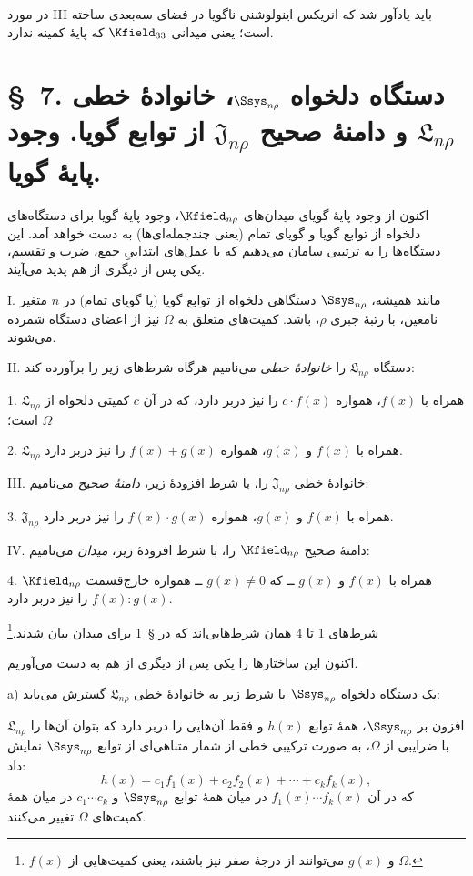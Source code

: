 \documentclass[11pt]{article}
\newcommand{\srcLTR}[1]{\relax\ifmmode\text{\mbox{\babelsublr{\foreignlanguage{english}{#1}}}}\else\babelsublr{\foreignlanguage{english}{#1}}\fi}
\newcommand{\srcfn}[2]{\begingroup\renewcommand{\thefootnote}{\srcLTR{#1}}\footnote{#2}\addtocounter{footnote}{-1}\endgroup}
\providecommand{\Lsys}{\mathfrak{L}}
\providecommand{\Jdom}{\mathfrak{J}}
\begin{document}
در مورد III باید یادآور شد که انریکس اینولوشنی ناگویا در فضای سه‌بعدی ساخته است؛ یعنی میدانی $\Kfield_{33}$ که پایهٔ کمینه ندارد.

\section*{\S\ 7. دستگاه دلخواه $\Ssys_{n\rho}$، خانوادهٔ خطی $\Lsys_{n\rho}$ و دامنهٔ صحیح $\Jdom_{n\rho}$ از توابع گویا. وجود پایهٔ گویا.}

اکنون از وجود پایهٔ گویای میدان‌های $\Kfield_{n\rho}$، وجود پایهٔ گویا برای دستگاه‌های دلخواه از توابع گویا و گویای تمام (یعنی چندجمله‌ای‌ها) به دست خواهد آمد. این دستگاه‌ها را به ترتیبی سامان می‌دهیم که با عمل‌های ابتداییِ جمع، ضرب و تقسیم، یکی پس از دیگری از هم پدید می‌آیند.

I. مانند همیشه، $\Ssys_{n\rho}$ دستگاهی دلخواه از توابع گویا (یا گویای تمام) در $n$ متغیر نامعین، با رتبهٔ جبری $\rho$، باشد. کمیت‌های متعلق به $\Omega$ نیز از اعضای دستگاه شمرده می‌شوند.

II. دستگاه $\Lsys_{n\rho}$ را \emph{خانوادهٔ خطی} می‌نامیم هرگاه شرط‌های زیر را برآورده کند:

1. $\Lsys_{n\rho}$ همراه با $f(x)$، همواره $c\cdot f(x)$ را نیز دربر دارد، که در آن $c$ کمیتی دلخواه از $\Omega$ است؛

2. $\Lsys_{n\rho}$ همراه با $f(x)$ و $g(x)$، همواره $f(x)+g(x)$ را نیز دربر دارد.

III. خانوادهٔ خطی $\Jdom_{n\rho}$ را، با شرط افزودهٔ زیر، \emph{دامنهٔ صحیح} می‌نامیم:

3. $\Jdom_{n\rho}$ همراه با $f(x)$ و $g(x)$، همواره $f(x)\cdot g(x)$ را نیز دربر دارد.

IV. دامنهٔ صحیح $\Kfield_{n\rho}$ را، با شرط افزودهٔ زیر، \emph{میدان} می‌نامیم:

4. $\Kfield_{n\rho}$ همراه با $f(x)$ و $g(x)$ ــ که $g(x)\ne0$ ــ همواره خارج‌قسمت $f(x):g(x)$ را نیز دربر دارد.

شرط‌های 1 تا 4 همان شرط‌هایی‌اند که در \S\ 1 برای میدان بیان شدند.\srcfn{*)}{$f(x)$ و $g(x)$ می‌توانند از درجهٔ صفر نیز باشند، یعنی کمیت‌هایی از $\Omega$.}

اکنون این ساختارها را یکی پس از دیگری از هم به دست می‌آوریم.

a) یک دستگاه دلخواه $\Ssys_{n\rho}$ با شرط زیر به خانوادهٔ خطی $\Lsys_{n\rho}$ گسترش می‌یابد:

$\Lsys_{n\rho}$ افزون بر $\Ssys_{n\rho}$، همهٔ توابع $h(x)$ و فقط آن‌هایی را دربر دارد که بتوان آن‌ها را با ضرایبی از $\Omega$، به صورت ترکیبی خطی از شمار متناهی‌ای از توابع $\Ssys_{n\rho}$ نمایش داد:
\[
h(x)=c_1f_1(x)+c_2f_2(x)+\cdots+c_kf_k(x),
\]
که در آن $f_1(x)\cdots f_k(x)$ در میان همهٔ توابع $\Ssys_{n\rho}$ و $c_1\cdots c_k$ در میان همهٔ کمیت‌های $\Omega$ تغییر می‌کنند.
\end{document}
